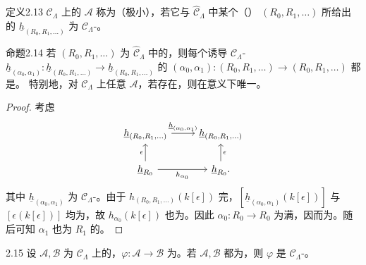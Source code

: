 \begin{SGAresult}{定义}{2.13}
$\mathcal C_\Lambda$ 上的 $\mathcal A$ 称为（极小），若它与 $\widehat{\mathcal C}_\Lambda$ 中某个（） $(R_0,R_1,\ldots)$ 所给出的 $\underline h_{(R_0,R_1,\ldots)}$ 为 $\mathcal C_\Lambda$-。
\end{SGAresult}
\begin{SGAresult}{命题}{2.14}
若 $(R_0,R_1,\ldots)$ 为 $\widehat{\mathcal C}_\Lambda$ 中的，则每个诱导 $\mathcal C_\Lambda$-
$\underline h_{(\alpha_0,\alpha_1)}:\underline h_{(R_0,R_1,\ldots)}\to\underline h_{(R_0,R_1,\ldots)}$
的 $(\alpha_0,\alpha_1):(R_0,R_1,\ldots)\to(R_0,R_1,\ldots)$ 都是。
特别地，对 $\mathcal C_\Lambda$ 上任意 $\mathcal A$，若存在，则在意义下唯一。
\end{SGAresult}
\begin{proof}
考虑
\[
\begin{tikzcd}
\underline h_{(R_0,R_1,\ldots)}\arrow[r,"{\underline h_{(\alpha_0,\alpha_1)}}"]&\underline h_{(R_0,R_1,\ldots)}\\
\underline h_{R_0}\arrow[u,"\epsilon"]\arrow[r,"h_{\alpha_0}"']&\underline h_{R_0}\arrow[u,"\epsilon"'].
\end{tikzcd}
\]
其中 $\underline h_{(\alpha_0,\alpha_1)}$ 为 $\mathcal C_\Lambda$-。由于 $h_{(R_0,R_1,\ldots)}(k[\epsilon])$ 完，$[\underline h_{(\alpha_0,\alpha_1)}(k[\epsilon])]$ 与 $[\epsilon(k[\epsilon])]$ 均为，故 $h_{\alpha_0}(k[\epsilon])$ 也为。因此 $\alpha_0:R_0\to R_0$ 为满，因而为。随后可知 $\alpha_1$ 也为 $R_1$ 的。
\end{proof}
\begin{SGAresult}{}{2.15}
设 $\mathcal A,\mathcal B$ 为 $\mathcal C_\Lambda$ 上的，$\varphi:\mathcal A\to\mathcal B$ 为。若 $\mathcal A,\mathcal B$ 都为，则 $\varphi$ 是 $\mathcal C_\Lambda$-。
\end{SGAresult}
